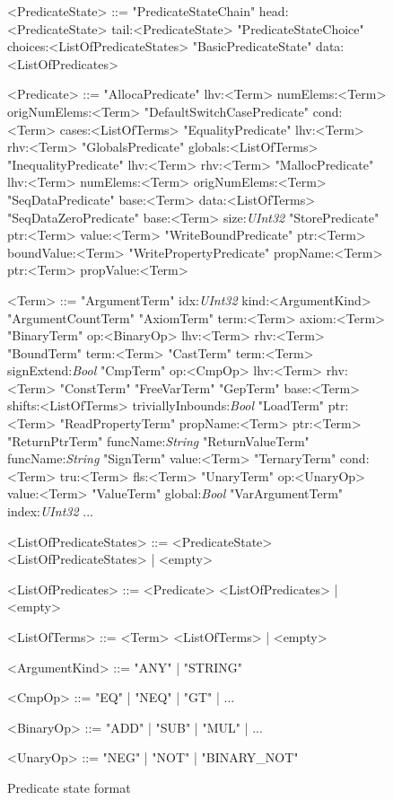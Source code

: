 \renewcommand{\litleft}{\bfshape}
\renewcommand{\litright}{}

\begin{figure*}[p]

\caption{Predicate state format}
\label{fig:predicate-state}

\begin{grammar}

<PredicateState> ::= "PredicateStateChain" head:<PredicateState> tail:<PredicateState>
\alt "PredicateStateChoice" choices:<ListOfPredicateStates>
\alt "BasicPredicateState" data:<ListOfPredicates>

<Predicate> ::= "AllocaPredicate" lhv:<Term> numElems:<Term> origNumElems:<Term>
\alt "DefaultSwitchCasePredicate" cond:<Term> cases:<ListOfTerms>
\alt "EqualityPredicate" lhv:<Term> rhv:<Term>
\alt "GlobalsPredicate" globals:<ListOfTerms>
\alt "InequalityPredicate" lhv:<Term> rhv:<Term>
\alt "MallocPredicate" lhv:<Term> numElems:<Term> origNumElems:<Term>
\alt "SeqDataPredicate" base:<Term> data:<ListOfTerms>
\alt "SeqDataZeroPredicate" base:<Term> size:\textit{UInt32}
\alt "StorePredicate" ptr:<Term> value:<Term>
\alt "WriteBoundPredicate" ptr:<Term> boundValue:<Term>
\alt "WritePropertyPredicate" propName:<Term> ptr:<Term> propValue:<Term>

<Term> ::= "ArgumentTerm" idx:\textit{UInt32} kind:<ArgumentKind>
\alt "ArgumentCountTerm"
\alt "AxiomTerm" term:<Term> axiom:<Term>
\alt "BinaryTerm" op:<BinaryOp> lhv:<Term> rhv:<Term>
\alt "BoundTerm" term:<Term>
\alt "CastTerm" term:<Term> signExtend:\textit{Bool}
\alt "CmpTerm" op:<CmpOp> lhv:<Term> rhv:<Term>
\alt "ConstTerm"
\alt "FreeVarTerm"
\alt "GepTerm" base:<Term> shifts:<ListOfTerms> triviallyInbounds:\textit{Bool}
\alt "LoadTerm" ptr:<Term>
\alt "ReadPropertyTerm" propName:<Term> ptr:<Term>
\alt "ReturnPtrTerm" funcName:\textit{String}
\alt "ReturnValueTerm" funcName:\textit{String}
\alt "SignTerm" value:<Term>
\alt "TernaryTerm" cond:<Term> tru:<Term> fls:<Term>
\alt "UnaryTerm" op:<UnaryOp> value:<Term>
\alt "ValueTerm" global:\textit{Bool}
\alt "VarArgumentTerm" index:\textit{UInt32}
\alt ...

<ListOfPredicateStates> ::= <PredicateState> <ListOfPredicateStates> | <empty>

<ListOfPredicates> ::= <Predicate> <ListOfPredicates> | <empty>

<ListOfTerms> ::= <Term> <ListOfTerms> | <empty>

<ArgumentKind> ::= "ANY" | "STRING"

<CmpOp> ::= "EQ" | "NEQ" | "GT" | ...

<BinaryOp> ::=  "ADD" | "SUB" | "MUL" | ...

<UnaryOp> ::= "NEG" | "NOT" | "BINARY_NOT"

\end{grammar}
\end{figure*}

